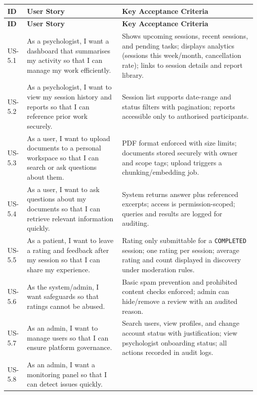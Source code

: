 \documentclass[a4paper,12pt]{report}
\begin{document}
\begin{longtable}{@{} L{0.10\textwidth} L{0.50\textwidth} L{0.32\textwidth} @{}}
\toprule
\textbf{ID} &
\textbf{User Story} &
\textbf{Key Acceptance Criteria} \\
\midrule
\endfirsthead

\toprule
\textbf{ID} &
\textbf{User Story} &
\textbf{Key Acceptance Criteria} \\
\midrule
\endhead

US-5.1 & As a psychologist, I want a dashboard that summarises my activity so that I can manage my work efficiently. &
Shows upcoming sessions, recent sessions, and pending tasks; displays analytics (sessions this week/month, cancellation rate); links to session details and report library. \\
\midrule
US-5.2 & As a psychologist, I want to view my session history and reports so that I can reference prior work securely. &
Session list supports date-range and status filters with pagination; reports accessible only to authorised participants. \\
\midrule
US-5.3 & As a user, I want to upload documents to a personal workspace so that I can search or ask questions about them. &
PDF format enforced with size limits; documents stored securely with owner and scope tags; upload triggers a chunking/embedding job. \\
\midrule
US-5.4 & As a user, I want to ask questions about my documents so that I can retrieve relevant information quickly. &
System returns answer plus referenced excerpts; access is permission-scoped; queries and results are logged for auditing. \\
\midrule
US-5.5 & As a patient, I want to leave a rating and feedback after my session so that I can share my experience. &
Rating only submittable for a \texttt{COMPLETED} session; one rating per session; average rating and count displayed in discovery under moderation rules. \\
\midrule
US-5.6 & As the system/admin, I want safeguards so that ratings cannot be abused. &
Basic spam prevention and prohibited content checks enforced; admin can hide/remove a review with an audited reason. \\
\midrule
US-5.7 & As an admin, I want to manage users so that I can ensure platform governance. &
Search users, view profiles, and change account status with justification; view psychologist onboarding status; all actions recorded in audit logs. \\
\midrule
US-5.8 & As an admin, I want a monitoring panel so that I can detect issues quickly. &

\end{longtable}
\end{document}
